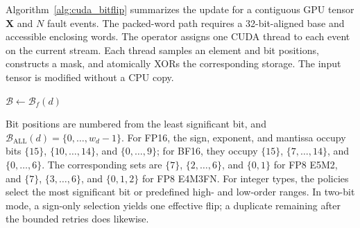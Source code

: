 Algorithm~\ref{alg:cuda_bitflip} summarizes the update for a contiguous GPU tensor $\mathbf{X}$ and $N$ fault events. The packed-word path requires a 32-bit-aligned base and accessible enclosing words. The operator assigns one CUDA thread to each event on the current stream. Each thread samples an element and bit positions, constructs a mask, and atomically XORs the corresponding storage. The input tensor is modified without a CPU copy.

\begin{algorithm}[t]
\footnotesize
\DontPrintSemicolon
\SetAlgoVlined
\SetInd{0.35em}{0.75em}

\caption{GPU In-Place Bit-Flip Injection}
\label{alg:cuda_bitflip}


$\mathcal{B}\leftarrow\mathcal{B}_{f}(d)$\;

\end{algorithm}

Bit positions are numbered from the least significant bit, and $\mathcal{B}_{\mathrm{ALL}}(d)=\{0,\ldots,w_d-1\}$. For FP16, the sign, exponent, and mantissa occupy bits $\{15\}$, $\{10,\ldots,14\}$, and $\{0,\ldots,9\}$; for BF16, they occupy $\{15\}$, $\{7,\ldots,14\}$, and $\{0,\ldots,6\}$. The corresponding sets are $\{7\}$, $\{2,\ldots,6\}$, and $\{0,1\}$ for FP8 E5M2, and $\{7\}$, $\{3,\ldots,6\}$, and $\{0,1,2\}$ for FP8 E4M3FN. For integer types, the policies select the most significant bit or predefined high- and low-order ranges. In two-bit mode, a sign-only selection yields one effective flip; a duplicate remaining after the bounded retries does likewise.

